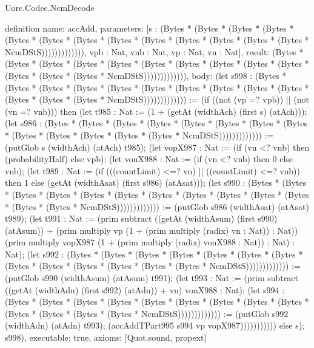 \begin{lexlean}{Uorc.Codec.NcmDecode}
\begin{semanticmodule}
definition{
  name: accAdd,
  parameters: [s : (Bytes * (Bytes * (Bytes * (Bytes * (Bytes * (Bytes * (Bytes * (Bytes * (Bytes * (Bytes * (Bytes * (Bytes * (Bytes * NcmDStS))))))))))))), vpb : Nat, vnb : Nat, vp : Nat, vn : Nat],
  result: (Bytes * (Bytes * (Bytes * (Bytes * (Bytes * (Bytes * (Bytes * (Bytes * (Bytes * (Bytes * (Bytes * (Bytes * (Bytes * NcmDStS))))))))))))),
  body: (let s998 : (Bytes * (Bytes * (Bytes * (Bytes * (Bytes * (Bytes * (Bytes * (Bytes * (Bytes * (Bytes * (Bytes * (Bytes * (Bytes * NcmDStS))))))))))))) := (if ((not (vp =? vpb)) || (not (vn =? vnb))) then (let t985 : Nat := (1 + (getAt (widthAch) (first s) (atAch))); (let s986 : (Bytes * (Bytes * (Bytes * (Bytes * (Bytes * (Bytes * (Bytes * (Bytes * (Bytes * (Bytes * (Bytes * (Bytes * (Bytes * NcmDStS))))))))))))) := (putGlob s (widthAch) (atAch) t985); (let vopX987 : Nat := (if (vn <? vnb) then (probabilityHalf) else vpb); (let vonX988 : Nat := (if (vn <? vnb) then 0 else vnb); (let t989 : Nat := (if (((countLimit) <=? vn) || ((countLimit) <=? vnb)) then 1 else (getAt (widthAsat) (first s986) (atAsat))); (let s990 : (Bytes * (Bytes * (Bytes * (Bytes * (Bytes * (Bytes * (Bytes * (Bytes * (Bytes * (Bytes * (Bytes * (Bytes * (Bytes * NcmDStS))))))))))))) := (putGlob s986 (widthAsat) (atAsat) t989); (let t991 : Nat := (prim subtract ((getAt (widthAsum) (first s990) (atAsum)) + (prim multiply vp (1 + (prim multiply (radix) vn : Nat)) : Nat)) (prim multiply vopX987 (1 + (prim multiply (radix) vonX988 : Nat)) : Nat) : Nat); (let s992 : (Bytes * (Bytes * (Bytes * (Bytes * (Bytes * (Bytes * (Bytes * (Bytes * (Bytes * (Bytes * (Bytes * (Bytes * (Bytes * NcmDStS))))))))))))) := (putGlob s990 (widthAsum) (atAsum) t991); (let t993 : Nat := (prim subtract ((getAt (widthAdn) (first s992) (atAdn)) + vn) vonX988 : Nat); (let s994 : (Bytes * (Bytes * (Bytes * (Bytes * (Bytes * (Bytes * (Bytes * (Bytes * (Bytes * (Bytes * (Bytes * (Bytes * (Bytes * NcmDStS))))))))))))) := (putGlob s992 (widthAdn) (atAdn) t993); (accAddTPart995 s994 vp vopX987))))))))))) else s); s998),
  executable: true,
  axioms: [Quot.sound, propext]
}


\end{semanticmodule}
\end{lexlean}
